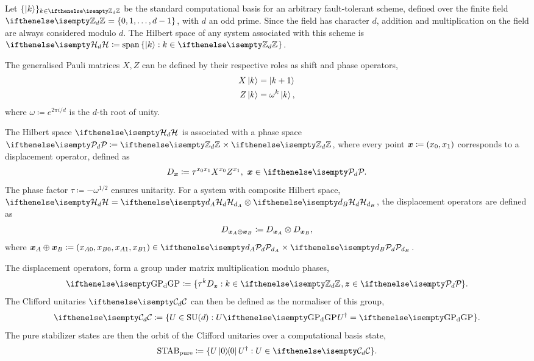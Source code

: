 \documentclass[pra,
aps,
twocolumn,
superscriptaddress,
groupedaddress,
nofootinbib,
reprint
]{revtex4-1}
\begin{document}
Let $\{\ket{k}\}_{k \in \zd}$ be the standard computational basis for an arbitrary fault-tolerant scheme, defined over the finite field $\zd = \{ 0, 1, \dots,d-1 \}$, with $d$ an odd prime. 
Since the field has character $d$, addition and multiplication on the field are always considered modulo $d$.
The Hilbert space of any system associated with this scheme is $\hd \coloneqq \spanv{\ket{k}: k \in \zd}$.

The generalised Pauli matrices $X, Z$ can be defined by their respective roles as shift and phase operators,
\begin{align}
    X \ket{k} &= \ket{k + 1} \label{eq:xpauli}\\
	Z \ket{k} &= \omega^k \ket{k}, \label{eq:zpauli}
\end{align}
where $\omega \coloneqq e^{2\pi i/d}$ is the $d$-th root of unity. 

The Hilbert space $\hd$ is associated with a phase space $\pd \coloneqq \zd \times \zd$, where every point $\bm{x} \coloneqq (x_0, x_1)$ corresponds to a displacement operator, defined as
\begin{equation}\label{eq:ddef}
    D_{\bmx} \coloneqq \tau^{x_0 x_1} X^{x_0} Z^{x_1},\ \bmx  \in \pd.
\end{equation}
The phase factor $\tau \coloneqq -\omega^{1/2}$ ensures unitarity.
For a system with composite Hilbert space, $\hd = \hd[d_A] \otimes \hd[d_B]$, the displacement operators are defined as
\begin{equation}\label{eq:composited}
    D_{\bm{x}_A \oplus \bm{x}_B} \coloneqq D_{\bm{x}_A} \otimes D_{\bm{x}_B},
\end{equation}
where $\bmx_A \oplus \bmx_B \coloneqq (x_{A0}, x_{B0}, x_{A1}, x_{B1}) \in \pd[d_A] \times \pd[d_B]$.

The displacement operators, form a group under matrix multiplication modulo phases,
\begin{equation}\label{eq:gp}
    \gp \coloneqq \{ \tau^k D_{\bmz}: k \in \zd, \bmz \in \pd\}.
\end{equation}
The Clifford unitaries $\cd$ can then be defined as the normaliser of this group, 
\begin{equation}
    \cd \coloneqq \{ U \in {\rm{SU}}(d): U\gp U^\dagger = \gp \}.
\end{equation}
The pure stabilizer states are then the orbit of the Clifford unitaries over a computational basis state,
\begin{equation}\label{eq:stab}
    \stab_{{\rm{pure}}} \coloneqq \{ U\ketbra{0}{0}U^\dagger: U \in \cd \}.
\end{equation}
\end{document}
